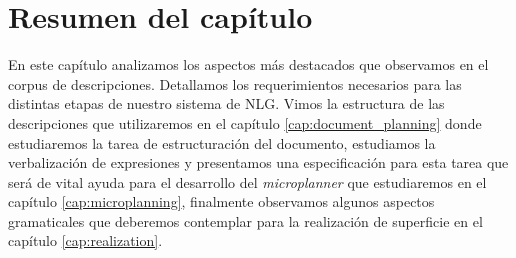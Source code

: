 \section{Resumen del capítulo}
En este capítulo analizamos los aspectos más destacados que observamos en el corpus de descripciones. Detallamos los requerimientos necesarios para las distintas etapas de nuestro sistema de NLG. Vimos la estructura de las descripciones que utilizaremos en el capítulo \ref{cap:document_planning} donde estudiaremos la tarea de estructuración del documento, estudiamos la verbalización de expresiones y presentamos una especificación para esta tarea que será de vital ayuda para el desarrollo del \emph{microplanner} que estudiaremos en el capítulo \ref{cap:microplanning}, finalmente observamos algunos aspectos gramaticales que deberemos contemplar para la realización de superficie en el capítulo \ref{cap:realization}.

